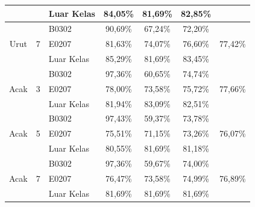 \begin{enumerate}
\begin{table}[H]
\begin{tabular}{|c|c|l|c|c|c|c|}
			                            &                    & Luar Kelas                       & 84,05\%   & 81,69\% & 82,85\%   &                          \\ \hline
			      \multirow{3}{*}{Urut} & \multirow{3}{*}{7} & B0302                            & 90,69\%   & 67,24\% & 72,20\%   & \multirow{3}{*}{77,42\%} \\ \cline{3-6}
			                            &                    & E0207                            & 81,63\%   & 74,07\% & 76,60\%   &                          \\ \cline{3-6}
			                            &                    & Luar Kelas                       & 85,29\%   & 81,69\% & 83,45\%   &                          \\ \hline
			      \multirow{3}{*}{Acak} & \multirow{3}{*}{3} & B0302                            & 97,36\%   & 60,65\% & 74,74\%   & \multirow{3}{*}{77,66\%} \\ \cline{3-6}
			                            &                    & E0207                            & 78,00\%   & 73,58\% & 75,72\%   &                          \\ \cline{3-6}
			                            &                    & Luar Kelas                       & 81,94\%   & 83,09\% & 82,51\%   &                          \\ \hline
			      \multirow{3}{*}{Acak} & \multirow{3}{*}{5} & B0302                            & 97,43\%   & 59,37\% & 73,78\%   & \multirow{3}{*}{76,07\%} \\ \cline{3-6}
			                            &                    & E0207                            & 75,51\%   & 71,15\% & 73,26\%   &                          \\ \cline{3-6}
			                            &                    & Luar Kelas                       & 80,55\%   & 81,69\% & 81,18\%   &                          \\ \hline
			      \multirow{3}{*}{Acak} & \multirow{3}{*}{7} & B0302                            & 97,36\%   & 59,67\% & 74,00\%   & \multirow{3}{*}{76,89\%} \\ \cline{3-6}
			                            &                    & E0207                            & 76,47\%   & 73,58\% & 74,99\%   &                          \\ \cline{3-6}
			                            &                    & Luar Kelas                       & 81,69\%   & 81,69\% & 81,69\%   &                          \\ \hline
		      \end{tabular}
	      \end{table}



\end{enumerate}
